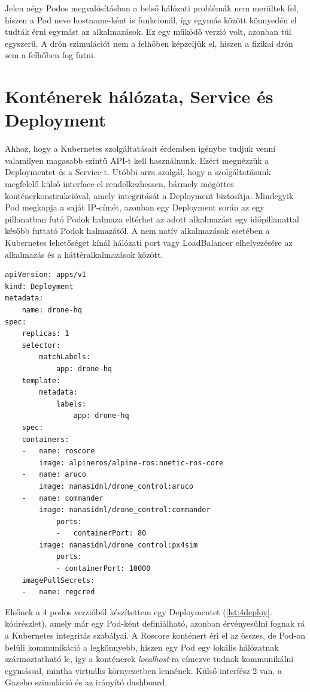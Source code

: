 \noindent
Jelen négy Podos megvalósításban a belső hálózati problémák nem merültek fel, hiszen a Pod neve hostname-ként is funkcionál, így egymás között könnyedén el tudták érni egymást az alkalmazások. Ez egy működő verzió volt, azonban túl egyszerű. A drón szimulációt nem a felhőben képzeljük el, hiszen a fizikai drón sem a felhőben fog futni.

\section{Konténerek hálózata, Service és Deployment}

Ahhoz, hogy a Kubernetes szolgáltatásait érdemben igénybe tudjuk venni valamilyen magasabb szintű API-t kell használnunk. Ezért megnézzük a Deploymentet és a Service-t. Utóbbi arra szolgál, hogy a szolgáltatásunk megfelelő külső interface-el rendelkezhessen, bármely mögöttes konténerkonstrukcióval, amely integritását a Deployment biztosítja. Mindegyik Pod megkapja a saját IP-címét, azonban egy Deployment során az egy pillanatban futó Podok halmaza eltérhet az adott alkalmazást egy időpillanattal később futtató Podok halmazától. A nem natív alkalmazások esetében a Kubernetes lehetőséget kínál hálózati port vagy LoadBalancer elhelyezésére az alkalmazás és a háttéralkalmazások között. \cite{kservice} \\

\begin{minipage}{\linewidth}
\begin{lstlisting}[caption={Példa 4 konténeres deployment megoldásra},label={lst:4deploy}]
apiVersion: apps/v1
kind: Deployment
metadata:
	name: drone-hq
spec:
	replicas: 1
	selector:
		matchLabels:
			app: drone-hq
	template:
		metadata:
			labels:
				app: drone-hq
	spec:
	containers:
	-	name: roscore
		image: alpineros/alpine-ros:noetic-ros-core 
	-	name: aruco
		image: nanasidnl/drone_control:aruco
	- 	name: commander
		image: nanasidnl/drone_control:commander
			ports: 
			-	containerPort: 80
		image: nanasidnl/drone_control:px4sim
			ports: 
			- containerPort: 10000
	imagePullSecrets:
	-	name: regcred
\end{lstlisting}
\end{minipage}

\noindent
Elsőnek a 4 podos verzióból készítettem egy Deploymentet (\ref{lst:4deploy}. kódrészlet), amely már egy Pod-ként definiálható, azonban érvényesülni fognak rá a Kubernetes integritás szabályai. A Roscore konténert éri el az összes, de Pod-on belüli kommunikáció a legkönnyebb, hiszen egy Pod egy lokális hálózatnak szármoztatható le, így a konténerek \emph{localhost}-ra címezve tudnak kommunikálni egymással, mintha virtuális környezetben lennének. Külső interfész 2 van, a Gazebo szimuláció és az irányító dashboard. \\

